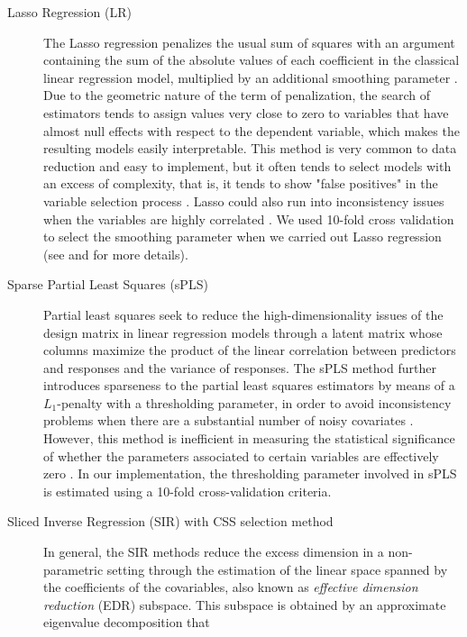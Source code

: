 \documentclass[12pt]{amsart}
\theoremstyle{plain}
\theoremstyle{definition}
\theoremstyle{remark}
\begin{document}
\begin{description}
\item[Lasso Regression (LR)]
  The Lasso regression penalizes the usual sum of squares with an argument
 containing the sum of the absolute values of each coefficient in the classical
 linear regression model, multiplied by an additional smoothing parameter \citep{Tibshirani1996}. Due
 to the geometric nature of the term of penalization, the search of estimators
 tends to assign values very close to zero to variables that have almost null
 effects with respect to the dependent variable, which makes the resulting
 models easily interpretable. This method is very common to data reduction and easy to implement, but it often tends to select models with an excess of complexity, that is,
 it tends to show "false positives" in the variable selection process 
 \citep{Fan2010}. Lasso could also run into inconsistency issues when the
 variables are highly correlated \citep{Zou2005}.
 We used 10-fold cross validation to select the smoothing parameter when we carried out Lasso regression (see \cite{Tibshirani1996} and \cite{Friedman2010} for more details). 
\item[Sparse Partial Least Squares (sPLS)] 
  Partial least squares seek to reduce the high-dimensionality issues of the
  design matrix in  
  linear regression models through a latent matrix whose columns maximize
  the product of the linear correlation between predictors and responses and the
  variance of responses. The sPLS method further introduces sparseness to the partial least squares
  estimators by means of a $L_1$-penalty with a thresholding parameter, in order to avoid inconsistency problems when there are a
  substantial number of noisy covariates \citep{Chun2010,Chung2013}. However, this method is inefficient in
  measuring the statistical significance of whether the parameters associated to certain
  variables are effectively zero \citep{OlsonHunt2014}. In our implementation, the
  thresholding parameter involved in sPLS is estimated using a 10-fold cross-validation criteria.    
\item[Sliced Inverse Regression (SIR) with CSS selection method]
  In general, the SIR methods \citep[among
  others]{Li1991,Duan1991,Zhong2005,Li2008,Coudret2014,Weisberg2002}  reduce the excess dimension in a non-parametric setting through the
  estimation of the linear space spanned by the coefficients of the covariables,
  also known as \textit{effective dimension reduction} (EDR) subspace. 
  This subspace is obtained by an approximate eigenvalue decomposition that

\end{description}
\end{document}
